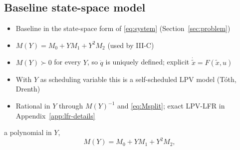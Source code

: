 \subsection{Baseline state-space model}\label{sec:lfr}
\ifdraft
\begin{itemize}
\item Baseline in the state-space form of \eqref{eq:system} (Section~\ref{sec:problem})
\item $M(Y)=M_0+YM_1+Y^2M_2$ (used by III-C)
\item $M(Y)\succ0$ for every $Y$, so $\ddot q$ is uniquely defined; explicit $\dot{\tilde x}=F(\tilde x,u)$
\item With $Y$ as scheduling variable this is a self-scheduled LPV model (T\'oth, Drenth)
\item Rational in $Y$ through $M(Y)^{-1}$ and \eqref{eq:Msplit}; exact LPV-LFR in Appendix~\ref{app:lfr-details}
\end{itemize}
\fi
 a polynomial in $Y$,
\begin{equation}
  M(Y)=M_0+YM_1+Y^2M_2,
  \label{eq:Msplit}
\end{equation}
